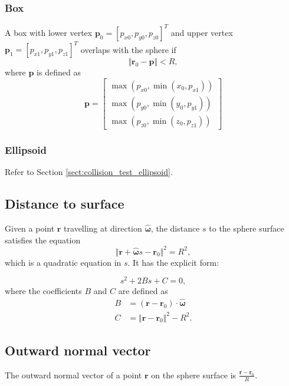 \subsubsection{Box}
A box with lower vertex $\bm{p}_0 = [p_{x0}, p_{y0}, p_{z0}]^T$ and upper vertex $\bm{p}_1 = [p_{x1}, p_{y1}, p_{z1}]^T$ overlaps with the sphere if
\begin{equation}
    \Vert \bm{r}_0 - \bm{p} \Vert < R,
\end{equation}
where $\bm{p}$ is defined as
\begin{equation}
    \bm{p} =
    \begin{bmatrix}
        \max(p_{x0}, \min(x_0, p_{x1})) \\
        \max(p_{y0}, \min(y_0, p_{y1})) \\
        \max(p_{z0}, \min(z_0, p_{z1}))
    \end{bmatrix}
\end{equation}

\subsubsection{Ellipsoid}
Refer to Section \ref{sect:collision_test_ellipsoid}.

\subsection{Distance to surface}
Given a point $\bm{r}$ travelling at direction $\bm{\hat{\omega}}$, the distance $s$ to the sphere surface satisfies the equation
\begin{equation}
    \Vert \bm{r} + \bm{\hat{\omega}}s - \bm{r}_0 \Vert^2 = R^2,
\end{equation}
which is a quadratic equation in $s$. It has the explicit form:

\begin{equation}
    s^2 + 2Bs + C = 0,
    \label{eqn:distance_sphere}
\end{equation}
where the coefficients $B$ and $C$ are defined as
\begin{align}
    B &= (\bm{r} - \bm{r}_0) \cdot \bm{\hat{\omega}} \\
    C &= \Vert \bm{r} - \bm{r}_0 \Vert^2 - R^2.
\end{align}

\subsection{Outward normal vector}
The outward normal vector of a point $\bm{r}$ on the sphere surface is $\displaystyle \frac{\bm{r} - \bm{r}_0}{R}$.